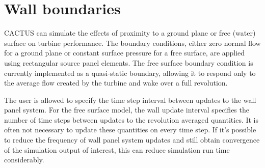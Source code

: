 \section{Wall boundaries}
CACTUS can simulate the effects of proximity to a ground plane or free (water) surface on turbine performance. The boundary conditions, either zero normal flow for a ground plane or constant surface pressure for a free surface, are applied using rectangular source panel elements. The free surface boundary condition is currently implemented as a quasi-static boundary, allowing it to respond only to the average flow created by the turbine and wake over a full revolution. 

The user is allowed to specify the time step interval between updates to the wall panel system. For the free surface model, the wall update interval specifies the number of time steps between updates to the revolution averaged quantities. It is often not necessary to update these quantities on every time step. If it's possible to reduce the frequency of wall panel system updates and still obtain convergence of the simulation output of interest, this can reduce simulation run time considerably.